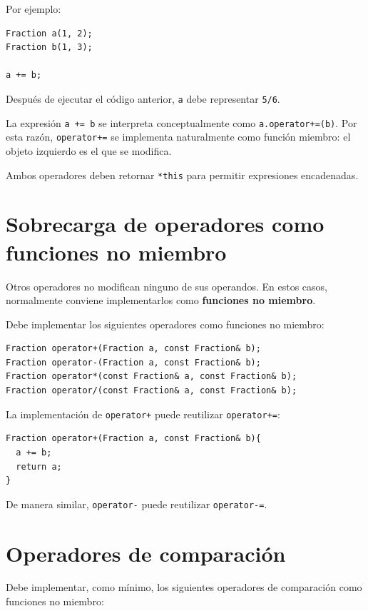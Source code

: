 \documentclass[11pt,a4paper]{article}
\begin{document}
Por ejemplo:

\begin{lstlisting}
Fraction a(1, 2);
Fraction b(1, 3);

a += b;
\end{lstlisting}

Después de ejecutar el código anterior, \lstinline|a| debe representar \lstinline|5/6|.

La expresión \lstinline|a += b| se interpreta conceptualmente como \lstinline|a.operator+=(b)|. Por esta razón, \lstinline|operator+=| se implementa naturalmente como función miembro: el objeto izquierdo es el que se modifica.

Ambos operadores deben retornar \lstinline|*this| para permitir expresiones encadenadas.

\section{Sobrecarga de operadores como funciones no miembro}

Otros operadores no modifican ninguno de sus operandos. En estos casos, normalmente conviene implementarlos como \textbf{funciones no miembro}.

Debe implementar los siguientes operadores como funciones no miembro:

\begin{lstlisting}
Fraction operator+(Fraction a, const Fraction& b);
Fraction operator-(Fraction a, const Fraction& b);
Fraction operator*(const Fraction& a, const Fraction& b);
Fraction operator/(const Fraction& a, const Fraction& b);
\end{lstlisting}

La implementación de \lstinline|operator+| puede reutilizar \lstinline|operator+=|:

\begin{lstlisting}
Fraction operator+(Fraction a, const Fraction& b){
  a += b;
  return a;
}
\end{lstlisting}

De manera similar, \lstinline|operator-| puede reutilizar \lstinline|operator-=|.

\section{Operadores de comparación}

Debe implementar, como mínimo, los siguientes operadores de comparación como funciones no miembro:
\end{document}
